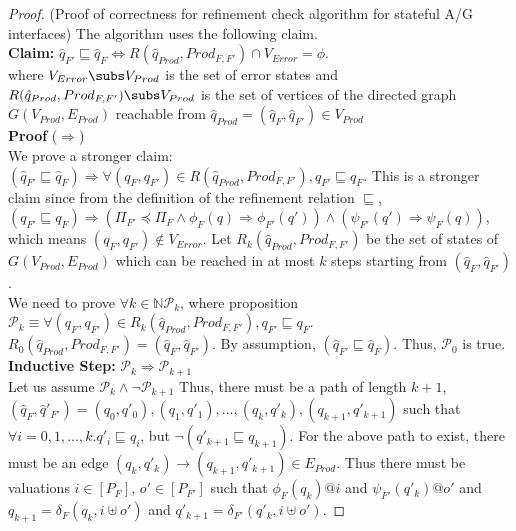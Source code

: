 \begin{proof}{(Proof of correctness for refinement check algorithm for 
stateful A/G interfaces)}
\newline
The algorithm uses the following claim. \\
{\bf Claim:} $\hat{q}_{F'} \sqsubseteq \hat{q}_F \iff 
R(\hat{q}_{Prod},Prod_{F,F'}) \cap V_{Error} = \phi$. \\
where $V_{Error} \subs V_{Prod}$ is the set of error states and
$R(\hat{q}_{Prod},Prod_{F,F'}) \subs V_{Prod}$ is the set of vertices of 
the directed graph $G(V_{Prod},E_{Prod})$ reachable from $\hat{q}_{Prod} = 
(\hat{q}_F,\hat{q}_{F'}) \in V_{Prod}$ \\
{\bf Proof} ($\Rightarrow$) \\
We prove a stronger claim: \\
$(\hat{q}_{F'} \sqsubseteq \hat{q}_F) \Rightarrow \forall (q_F,q_{F'}) \in
R(\hat{q}_{Prod},Prod_{F,F'}), q_{F'} \sqsubseteq q_F$.
This is a stronger claim since from the definition of the refinement relation
$\sqsubseteq$, $(q_{F'} \sqsubseteq q_F) \Rightarrow (\Pi_{F'} \preceq \Pi_F
\land \phi_F(q) \Rightarrow \phi_{F'}(q')) \land (\psi_{F'}(q') \Rightarrow 
\psi_F(q))$, which means $(q_F,q_{F'}) \notin V_{Error}$.
Let $R_k(\hat{q}_{Prod},Prod_{F,F'})$ be the set of states of 
$G(V_{Prod},E_{Prod})$ which can be reached in at most $k$ steps starting 
from $(\hat{q}_F,\hat{q}_{F'})$. \\
We need to prove $\forall k \in \mathbb{N} \mathcal{P}_k$, where proposition
$\mathcal{P}_k \equiv  \forall (q_F,q_{F'}) \in 
R_k(\hat{q}_{Prod},Prod_{F,F'}), q_{F'} \sqsubseteq q_F$.
$R_0(\hat{q}_{Prod},Prod_{F,F'}) = (\hat{q}_F,\hat{q}_{F'})$.
By assumption, $(\hat{q}_{F'} \sqsubseteq \hat{q}_F)$.
Thus, $\mathcal{P}_0$ is true. \\
{\bf Inductive Step:} $\mathcal{P}_k \Rightarrow \mathcal{P}_{k+1}$ \\
Let us assume $\mathcal{P}_k \land \lnot \mathcal{P}_{k+1}$
Thus, there must be a path of length $k+1$, $(\hat{q}_F,\hat{q}'_{F'}) = 
(q_0,q'_0), (q_1,q'_1), \dots ,(q_k,q'_k), (q_{k+1},q'_{k+1})$ such that 
$\forall i = 0,1, \dots,k. q'_i \sqsubseteq q_i $, but $\lnot (q'_{k+1} 
\sqsubseteq q_{k+1})$.
For the above path to exist, there must be an edge $(q_k,q'_k) \rightarrow 
(q_{k+1},q'_{k+1}) \in E_{Prod}$. Thus there must be valuations $i \in 
[P_F]$, $o' \in [P_{F'}]$ such that $\phi_F(q_k) @ i$ and 
$\psi_{F'}(q'_k) @ o'$ and $q_{k+1} = \delta_F(q_k,i \uplus o')$
and $q'_{k+1} = \delta_{F'}(q'_k,i \uplus o')$.

\end{proof}
